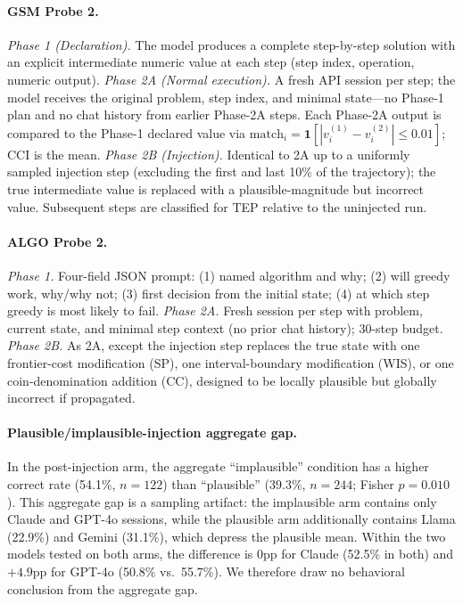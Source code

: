 \paragraph{GSM Probe 2.}
\emph{Phase 1 (Declaration).} The model produces a complete step-by-step
solution with an explicit intermediate numeric value at each step (step
index, operation, numeric output). \emph{Phase 2A (Normal execution).} A
fresh API session per step; the model receives the original problem, step
index, and minimal state---no Phase-1 plan and no chat history from earlier
Phase-2A steps. Each Phase-2A output is compared to the Phase-1 declared value
via $\mathrm{match}_i{=}\mathbf{1}[|v_i^{(1)}-v_i^{(2)}|\leq 0.01]$; CCI is the
mean. \emph{Phase 2B (Injection).} Identical to 2A up to a uniformly sampled
injection step (excluding the first and last 10\% of the trajectory); the true
intermediate value is replaced with a plausible-magnitude but incorrect value.
Subsequent steps are classified for TEP relative to the uninjected run.

\paragraph{ALGO Probe 2.}
\emph{Phase 1.} Four-field JSON prompt: (1) named algorithm and why; (2) will
greedy work, why/why not; (3) first decision from the initial state; (4) at
which step greedy is most likely to fail. \emph{Phase 2A.} Fresh session per
step with problem, current state, and minimal step context (no prior chat
history); 30-step budget. \emph{Phase 2B.} As 2A, except the injection step
replaces the true state with one frontier-cost modification (SP), one
interval-boundary modification (WIS), or one coin-denomination addition (CC),
designed to be locally plausible but globally incorrect if propagated.

\paragraph{Plausible/implausible-injection aggregate gap.}
In the post-injection arm, the aggregate ``implausible'' condition has a
higher correct rate (54.1\%, $n{=}122$) than ``plausible'' (39.3\%,
$n{=}244$; Fisher $p{=}0.010$). This aggregate gap is a sampling artifact: the
implausible arm contains only Claude and GPT-4o sessions, while the plausible
arm additionally contains Llama (22.9\%) and Gemini (31.1\%), which depress
the plausible mean. Within the two models tested on both arms, the difference
is 0pp for Claude (52.5\% in both) and ${+}4.9$pp for GPT-4o (50.8\% vs.\
55.7\%). We therefore draw no behavioral conclusion from the aggregate gap.

